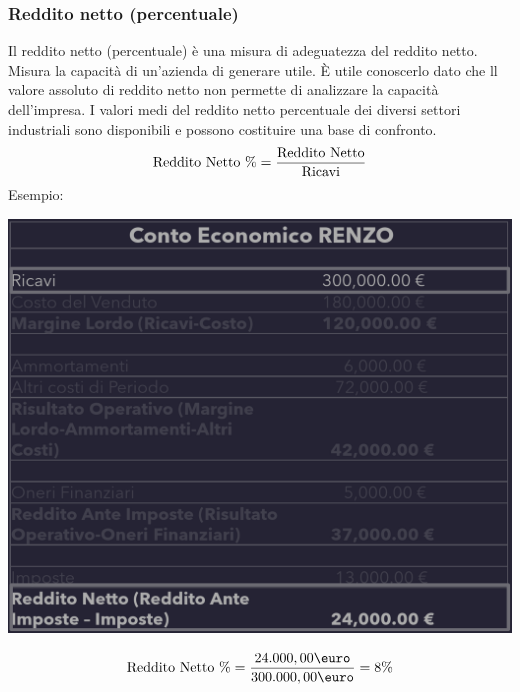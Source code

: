 \documentclass{article}
\begin{document}
\subsubsection{Reddito netto (percentuale)}
Il reddito netto (percentuale) è una misura di adeguatezza del reddito netto. Misura la capacità di un'azienda di generare utile. È utile conoscerlo dato che ll valore assoluto di reddito netto non permette di analizzare la capacità dell'impresa. I valori medi del reddito netto percentuale dei diversi settori industriali sono disponibili e possono
costituire una base di confronto.
\[
    \text{Reddito Netto \%} = \frac{\text{Reddito Netto}}{\text{Ricavi}}   
\]
Esempio:
\begin{center}
    \includegraphics[scale=0.3]{Image/RedditoNettoPerc.png}
\end{center}
\[
    \T{Reddito Netto \%} = \frac{24.000,00\T{\euro}}{300.000,00\T{\euro}} = 8\% 
\]
\end{document}
